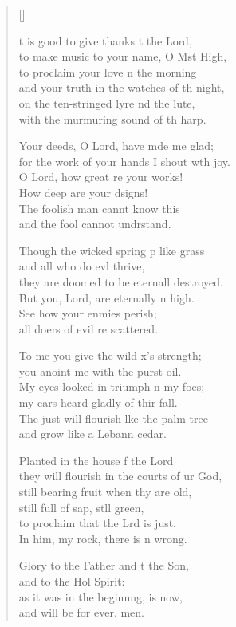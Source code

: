 \settowidth{\versewidth}{for the work of your hands I shout with joy.}
\begin{verse}[\versewidth]%
  \begin{patverse}
t is good to give thanks t the Lord,\Med\\
    to make music to your name, O Mst High,\\
to proclaim your love \pointup{\i}n the morning\Med\\
    and your truth in the watches of th night,\\
on the ten-stringed lyre nd the lute,\Med\\
    with the murmuring sound of th harp.

Your deeds, O Lord, have mde me glad;\Med\\
    for the work of your hands I shout w\pointup{\i}th joy.\\
O Lord, how great re your works!\Med\\
    How deep are your dsigns!\\
The foolish man cannt know this\Med\\
    and the fool cannot undrstand.

Though the wicked spring p like grass\Med\\
    and all who do ev\pointup{\i}l thrive,\\
they are doomed to be eternall destroyed.\Med\\
    But you, Lord, are eternally n high.\\
See how your enmies perish;\Med\\
    all doers of evil re scattered.

To me you give the wild x’s strength;\Med\\
    you anoint me with the purst oil.\\
My eyes looked in triumph n my foes;\Med\\
    my ears heard gladly of thir fall.\\
The just will flourish l\pointup{\i}ke the palm-tree\Med\\
    and grow like a Lebann cedar.

Planted in the house f the Lord\Med\\
    they will flourish in the courts of ur God,\\
still bearing fruit when thy are old,\Med\\
    still full of sap, st\pointup{\i}ll green,\\
to proclaim that the Lrd is just.\Med\\
    In him, my rock, there is n wrong.

Glory to the Father and t the Son,\Med\\
    and to the Hol Spirit:\\
as it was in the beginn\pointup{\i}ng, is now,\Med\\
    and will be for ever. men.
  \end{patverse}
  \end{verse}
